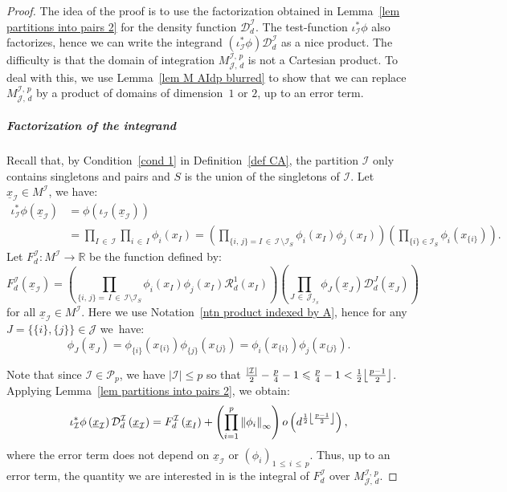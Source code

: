 \documentclass[AHL,Unicode,longabstracts,published]{cedram}
\DeclarePairedDelimiter{\floor}{\lfloor}{\rfloor}
\newcommand{\D}{\mathcal{D}}
\newcommand{\I}{\mathcal{I}}
\newcommand{\J}{\mathcal{J}}
\newcommand{\clR}{\mathcal{R}}
\newcommand{\pa}{\mathcal{P}\!}
\newcommand{\R}{\mathbb{R}}
\newcommand{\Norm}[1]{\left\lVert #1 \right\rVert}
\renewcommand{\leq}{\leqslant}
\begin{document}
\begin{proof}
The idea of the proof is to use the factorization obtained in Lemma~\ref{lem partitions into pairs 2} for the density function $\D^\I_d$. The test-function $\iota_\I^*\phi$ also factorizes, hence we can write the integrand $(\iota_\I^*\phi) \D^\I_d$ as a nice product. The difficulty is that the domain of integration $M^{\I,\,p}_{\J,\,d}$ is not a Cartesian product. To deal with this, we use Lemma~\ref{lem M AIdp blurred} to show that we can replace $M^{\I,\,p}_{\J,\,d}$ by a product of domains of dimension~$1$ or $2$, up to an error term.

\subparagraph*{Factorization of the integrand}
Recall that, by Condition~\eqref{cond 1} in Definition~\ref{def CA}, the partition $\I$ only contains singletons and pairs and $S$ is the union of the singletons of $\I$. Let $\underline{x}_\I \in M^\I$, we have:
\begin{align*}
\iota_\I^*\phi\left(\underline{x}_\I\right) &= \phi\left(\iota_\I\left(\underline{x}_\I\right)\right)\\
&= \prod_{I\,\in\,\I} \prod_{i\,\in\,I} \phi_i(x_I) = \left(\prod_{\{i,\,j\}=I\,\in\, \I\,\setminus \I_S} \phi_i(x_I)\phi_j(x_I)\right) \left(\prod_{\{i\} \in \I_S} \phi_i\left(x_{\{i\}}\right)\right).
\end{align*}
Let $F_d^\I: M^\I \to \R$ be the function defined by:
\begin{equation}\label{eq def FId}
F_d^\I(\underline{x}_\I) = \left(\prod_{\{i,\,j\}=\,I\,\in\,\I \setminus \I_S} \phi_i(x_I)\phi_j(x_I)\clR^1_d(x_I)\right)\left(\prod_{J\,\in\,\J_{\I_S}} \phi_J\left(\underline{x}_J\right)\D_d^J\left(\underline{x}_J\right)\right)
\end{equation}
for all $\underline{x}_\I \in M^\I$. Here we use Notation~\ref{ntn product indexed by A}, hence for any $J = \{\{i\},\{j\}\} \in \J$ we~have:
\[
\phi_J\left(\underline{x}_J\right) = \phi_{\{i\}}\left(x_{\{i\}}\right)\phi_{\{j\}}\left(x_{\{j\}}\right) = \phi_i\left(x_{\{i\}}\right)\phi_j\left(x_{\{j\}}\right).
\]

Note that since $\I \in \pa_p$, we have $|\I| \leq p$ so that $\frac{|\I|}{2}-\frac{p}{4}-1 \leq \frac{p}{4}-1 < \frac{1}{2}\floor*{\frac{p-1}{2}}$. Applying Lemma~\ref{lem partitions into pairs 2}, we obtain:
\begin{equation}\label{eq leading term}
\iota_\I^*\phi\left(\underline{x}_\I\right) \D^\I_d\left(\underline{x}_\I\right) = F_d^\I\left(\underline{x}_I\right)+\left(\prod_{i=1}^p \Norm{\phi_i}_\infty\right) o\left(d^{\frac{1}{2}\floor*{\frac{p-1}{2}}}\right),
\end{equation}
where the error term does not depend on $\underline{x}_\I$ or $(\phi_i)_{1\,\leq\,i\,\leq\,p}$. Thus, up to an error term, the quantity we are interested in is the integral of $F_d^\I$ over $M^{\I,\,p}_{\J,\,d}$.


\end{proof}
\end{document}
